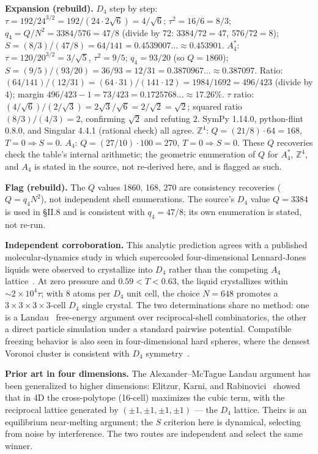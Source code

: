 \documentclass[11pt,a4paper]{article}
\newcommand{\expansion}[1]{\par\smallskip\noindent\textbf{Expansion (rebuild).} #1\par\smallskip}
\newcommand{\flagbox}[1]{\par\smallskip\noindent\textbf{Flag (rebuild).} #1\par\smallskip}
\begin{document}
\expansion{$D_4$ step by step: $\tau = 192/24^{3/2} = 192/(24\cdot 2\sqrt{6}) = 4/\sqrt{6}$; $\tau^2 = 16/6 = 8/3$; $q_4 = Q/N^2 = 3384/576 = 47/8$ (divide by 72: $3384/72 = 47$, $576/72 = 8$); $S = (8/3)/(47/8) = 64/141 = 0.4539007\ldots \approx 0.453901$. $A_4^*$: $\tau = 120/20^{3/2} = 3/\sqrt{5}$, $\tau^2 = 9/5$; $q_4 = 93/20$ (so $Q = 1860$); $S = (9/5)/(93/20) = 36/93 = 12/31 = 0.3870967\ldots \approx 0.387097$. Ratio: $(64/141)/(12/31) = (64\cdot 31)/(141\cdot 12) = 1984/1692 = 496/423$ (divide by 4); margin $496/423 - 1 = 73/423 = 0.1725768\ldots \approx 17.26\%$. $\tau$ ratio: $(4/\sqrt{6})/(2/\sqrt{3}) = 2\sqrt{3}/\sqrt{6} = 2/\sqrt{2} = \sqrt{2}$; squared ratio $(8/3)/(4/3) = 2$, confirming $\sqrt{2}$ and refuting $2$. SymPy 1.14.0, python-flint 0.8.0, and Singular 4.4.1 (rational check) all agree. $\mathbb{Z}^4$: $Q = (21/8)\cdot 64 = 168$, $T = 0 \Rightarrow S = 0$. $A_4$: $Q = (27/10)\cdot 100 = 270$, $T = 0 \Rightarrow S = 0$. These $Q$ recoveries check the table's internal arithmetic; the geometric enumeration of $Q$ for $A_4^*$, $\mathbb{Z}^4$, and $A_4$ is stated in the source, not re-derived here, and is flagged as such.}
\flagbox{The $Q$ values 1860, 168, 270 are consistency recoveries ($Q = q_4N^2$), not independent shell enumerations. The source's $D_4$ value $Q = 3384$ is used in \S II.8 and is consistent with $q_4 = 47/8$; its own enumeration is stated, not re-run.}

\textbf{Independent corroboration.} This analytic prediction agrees with a published molecular-dynamics study in which supercooled four-dimensional Lennard-Jones liquids were observed to crystallize into $D_4$ rather than the competing $A_4$ lattice~\cite{hoy2024}. At zero pressure and $0.59 < T < 0.63$, the liquid crystallizes within $\sim 2 \times 10^4\tau$; with 8 atoms per $D_4$ unit cell, the choice $N = 648$ promotes a $3 \times 3 \times 3 \times 3$-cell $D_4$ single crystal. The two determinations share no method: one is a Landau~\cite{landau1937} free-energy argument over reciprocal-shell combinatorics, the other a direct particle simulation under a standard pairwise potential. Compatible freezing behavior is also seen in four-dimensional hard spheres, where the densest Voronoi cluster is consistent with $D_4$ symmetry~\cite{vanmeel2009}.

\textbf{Prior art in four dimensions.} The Alexander--McTague Landau argument has been generalized to higher dimensions: Elitzur, Karni, and Rabinovici~\cite{elitzur2011} showed that in 4D the cross-polytope (16-cell) maximizes the cubic term, with the reciprocal lattice generated by $(\pm1,\pm1,\pm1,\pm1)$ --- the $D_4$ lattice. Theirs is an equilibrium near-melting argument; the $S$ criterion here is dynamical, selecting from noise by interference. The two routes are independent and select the same winner.
\end{document}
